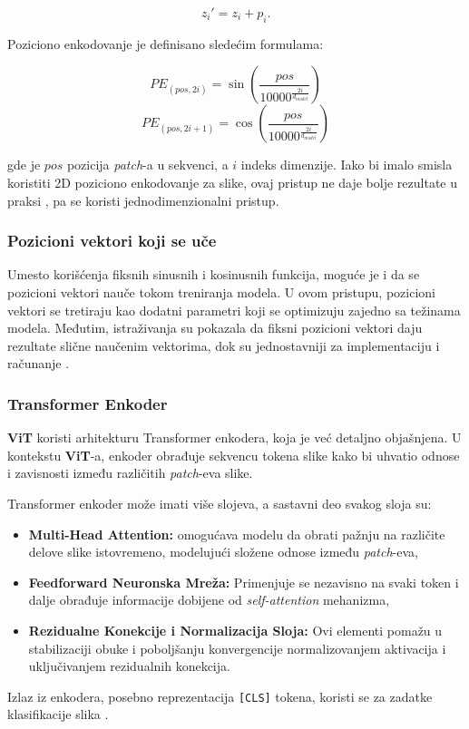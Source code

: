 \documentclass[12pt]{article}
\begin{document}
   \[
   z_i' = z_i + p_i.
   \]

   Poziciono enkodovanje je definisano sledećim formulama:

   \[
   PE_{(pos, 2i)} = \sin\left(\frac{pos}{10000^{\frac{2i}{d_{model}}}}\right)
   \]
   \[
   PE_{(pos, 2i+1)} = \cos\left(\frac{pos}{10000^{\frac{2i}{d_{model}}}}\right)
   \]

   gde je \( pos \) pozicija \textit{patch}-a u sekvenci, a \( i \) indeks dimenzije. 
   Iako bi imalo smisla koristiti 2D poziciono enkodovanje za slike, ovaj pristup ne daje bolje
   rezultate u praksi \cite{vit}, pa se koristi jednodimenzionalni pristup.

   \subsubsection*{Pozicioni vektori koji se uče}
   Umesto korišćenja fiksnih sinusnih i kosinusnih funkcija, moguće je i da se 
   pozicioni vektori nauče tokom treniranja modela. U ovom pristupu, 
   pozicioni vektori se tretiraju kao dodatni parametri koji se optimizuju zajedno sa 
   težinama modela. Međutim, istraživanja su pokazala da fiksni pozicioni vektori daju 
   rezultate slične naučenim vektorima, dok su jednostavniji za implementaciju i računanje \cite{vit}.


   \subsubsection{Transformer Enkoder}
   \textbf{ViT} koristi arhitekturu Transformer enkodera, koja je već detaljno objašnjena. U 
   kontekstu \textbf{ViT}-a, enkoder obrađuje sekvencu tokena slike kako bi uhvatio odnose 
   i zavisnosti između različitih \textit{patch}-eva slike.

   Transformer enkoder može imati više slojeva, a sastavni deo svakog sloja su:
\begin{itemize}
   \vspace{-0.5cm}
    \item \textbf{Multi-Head Attention:} omogućava modelu da obrati pažnju na različite 
    delove slike istovremeno, modelujući složene odnose između \textit{patch}-eva,
    \item \textbf{Feedforward Neuronska Mreža:} Primenjuje se nezavisno na svaki token i 
    dalje obrađuje informacije dobijene od \textit{self-attention} mehanizma,
    \item \textbf{Rezidualne Konekcije i Normalizacija Sloja:} Ovi elementi pomažu u 
    stabilizaciji obuke i poboljšanju konvergencije normalizovanjem aktivacija i 
    uključivanjem rezidualnih konekcija.
\end{itemize}
   Izlaz iz enkodera, posebno reprezentacija \texttt{[CLS]} tokena, koristi se za zadatke klasifikacije slika \cite{vit}. 
\end{document}
